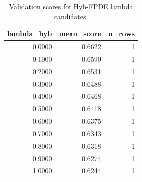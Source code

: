 \begin{table}[t]
\caption{Validation scores for Hyb-FPDE lambda candidates.}
\label{tab:lambda_distribution_computed}
\centering
\begin{tabular}{rrr}
\toprule
lambda\_hyb & mean\_score & n\_rows \\
\midrule
0.0000 & 0.6622 & 1 \\
0.1000 & 0.6590 & 1 \\
0.2000 & 0.6531 & 1 \\
0.3000 & 0.6488 & 1 \\
0.4000 & 0.6468 & 1 \\
0.5000 & 0.6418 & 1 \\
0.6000 & 0.6375 & 1 \\
0.7000 & 0.6343 & 1 \\
0.8000 & 0.6318 & 1 \\
0.9000 & 0.6274 & 1 \\
1.0000 & 0.6244 & 1 \\
\bottomrule
\end{tabular}

\end{table}

